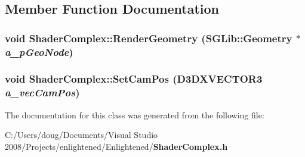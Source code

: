 \subsection{Member Function Documentation}
\subsubsection[{RenderGeometry}]{\setlength{\rightskip}{0pt plus 5cm}void ShaderComplex::RenderGeometry (SGLib::Geometry $\ast$ {\em a\_\-pGeoNode})\hspace{0.3cm}{\ttfamily  [inline]}}\label{class_shader_complex_aed3f29bdb3066be324b503adbcd6c120}
\subsubsection[{SetCamPos}]{\setlength{\rightskip}{0pt plus 5cm}void ShaderComplex::SetCamPos (D3DXVECTOR3 {\em a\_\-vecCamPos})\hspace{0.3cm}{\ttfamily  [inline]}}\label{class_shader_complex_acc368371245476af139ec5eb20b7353d}


The documentation for this class was generated from the following file:\begin{DoxyCompactItemize}
\item 
C:/Users/doug/Documents/Visual Studio 2008/Projects/enlightened/Enlightened/{\bf ShaderComplex.h}\end{DoxyCompactItemize}
